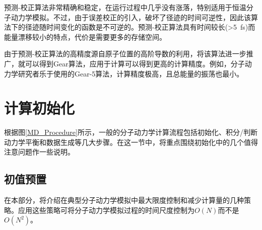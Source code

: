 预测-校正算法非常精确和稳定，在运行过程中几乎没有涨落，特别适用于恒温分子动力学模拟。不过，由于误差校正的引入，破坏了径迹的时间可逆性，因此该算法下的径迹随时间变化的函数是不可逆的。预测-校正算法具有时间较长(>5~\textrm{fs})而能量漂移较小的特点，代价是需要更多的存储空间。

由于预测-校正算法的高精度源自原子位置的高阶导数的利用，将该算法进一步推广，就可以得到\textrm{Gear}算法\cite{ODE_1971}，应用于计算可以得到更高的计算精度。例如，分子动力学研究者乐于使用的\textrm{Gear}-5算法，计算精度极高，且总能量的振荡也最小。

\section{计算初始化}
根据图\ref{MD_Procedure}所示，一般的分子动力学计算流程包括初始化、积分/判断动力学平衡和数据生成等几大步骤。在这一节中，将重点围绕初始化中的几个值得注意问题作一些说明。
\subsection{初值预置}
在本部分，将介绍在典型分子动力学模拟中最大限度控制和减少计算量的几种策略。应用这些策略可将分子动力学模拟过程的时间尺度控制为$O(N)$而不是$O(N^2)$。
